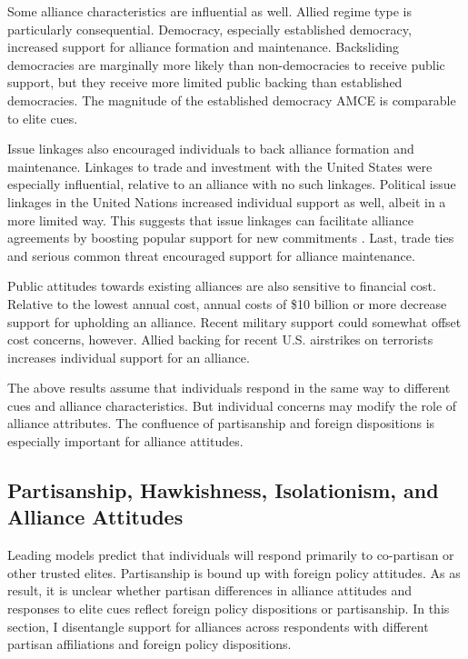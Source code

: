 \documentclass[12pt]{article}
\begin{document}
Some alliance characteristics are influential as well. 
Allied regime type is particularly consequential. 
Democracy, especially established democracy, increased support for alliance formation and maintenance.  
Backsliding democracies are marginally more likely than non-democracies to receive public support, but they receive more limited public backing than established democracies.
The magnitude of the established democracy AMCE is comparable to elite cues. 


Issue linkages also encouraged individuals to back alliance formation and maintenance. 
Linkages to trade and investment with the United States were especially influential, relative to an alliance with no such linkages. 
Political issue linkages in the United Nations increased individual support as well, albeit in a more limited way. 
This suggests that issue linkages can facilitate alliance agreements by boosting popular support for new commitments \citep{Poast2012}. 
Last, trade ties and serious common threat encouraged support for alliance maintenance. 
 

Public attitudes towards existing alliances are also sensitive to financial cost.
Relative to the lowest annual cost, annual costs of \$10 billion or more decrease support for upholding an alliance.  
Recent military support could somewhat offset cost concerns, however. 
Allied backing for recent U.S. airstrikes on terrorists increases individual support for an alliance. 


The above results assume that individuals respond in the same way to different cues and alliance characteristics. 
But individual concerns may modify the role of alliance attributes.
The confluence of partisanship and foreign dispositions is especially important for alliance attitudes. 



\subsection{Partisanship, Hawkishness, Isolationism, and Alliance Attitudes}


Leading models predict that individuals will respond primarily to co-partisan or other trusted elites. 
Partisanship is bound up with foreign policy attitudes. 
As as result, it is unclear whether partisan differences in alliance attitudes and responses to elite cues reflect foreign policy dispositions or partisanship. 
In this section, I disentangle support for alliances across respondents with different partisan affiliations and foreign policy dispositions.  
\end{document}
